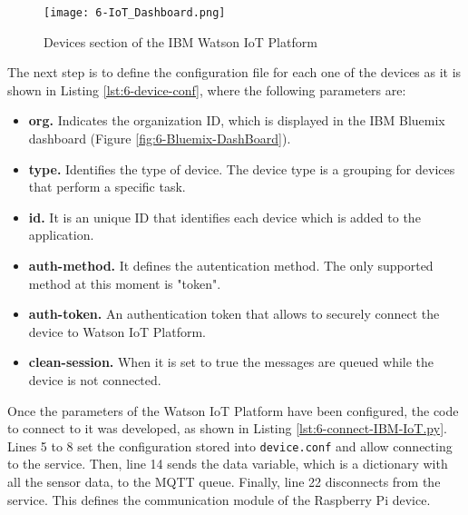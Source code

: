 \begin{figure}[!h]
	\begin{center}
		\texttt{[image: 6-IoT\_Dashboard.png]}
		\caption{Devices section of the IBM Watson IoT Platform}
		\label{fig:6-IoT_Dashboard}
	\end{center}
\end{figure}

The next step is to define the configuration file for each one of the devices as it is shown in Listing \ref{lst:6-device-conf}, where the following parameters are:
\begin{itemize}
	\item \textbf{org.} Indicates the organization ID, which is displayed in the IBM Bluemix dashboard (Figure \ref{fig:6-Bluemix-DashBoard}).
	\item \textbf{type.} Identifies the type of device. The device type is a grouping for devices that perform a specific task.
	\item \textbf{id.} It is an unique ID that identifies each device which is added to the application.
	\item \textbf{auth-method.} It defines the autentication method. The only supported method at this moment is "token".
	\item \textbf{auth-token.} An authentication token that allows to securely connect the device to Watson \ac{IoT} Platform.
	\item \textbf{clean-session.} When it is set to true the messages are queued while the device is not connected.
\end{itemize}



Once the parameters of the Watson \ac{IoT} Platform have been configured, the code to connect to it was developed, as shown in Listing \ref{lst:6-connect-IBM-IoT.py}. Lines 5 to 8 set the configuration stored into \texttt{device.conf} and allow connecting to the service. Then, line 14 sends the data variable, which is a dictionary with all the sensor data, to the MQTT queue. Finally, line 22 disconnects from the service. This defines the communication module of the Raspberry Pi device.



